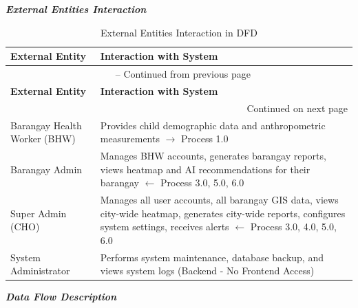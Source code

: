 \documentclass[12pt, a4paper]{report}
\begin{document}
\noindent \textbf{\textit{External Entities Interaction}}

\vspace{0.3cm}
\begin{longtable}{p{3.5cm} p{10.5cm}}
    \caption{External Entities Interaction in DFD} \label{tab:dfd_interaction} \\
    \toprule
    \textbf{External Entity} & \textbf{Interaction with System} \\
    \midrule
    \endfirsthead
    \multicolumn{2}{c}{{\tablename\ \thetable{} -- Continued from previous page}} \\
    \toprule
    \textbf{External Entity} & \textbf{Interaction with System} \\
    \midrule
    \endhead
    \midrule
    \multicolumn{2}{r}{{Continued on next page}} \\
    \endfoot
    \bottomrule
    \endlastfoot
    Barangay Health Worker (BHW) & Provides child demographic data and anthropometric measurements \(\rightarrow\) Process 1.0 \\
    \addlinespace
    Barangay Admin & Manages BHW accounts, generates barangay reports, views heatmap and AI recommendations for their barangay \(\leftarrow\) Process 3.0, 5.0, 6.0 \\
    \addlinespace
    Super Admin (CHO) & Manages all user accounts, all barangay GIS data, views city-wide heatmap, generates city-wide reports, configures system settings, receives alerts \(\leftarrow\) Process 3.0, 4.0, 5.0, 6.0 \\
    \addlinespace
    System Administrator & Performs system maintenance, database backup, and views system logs (Backend - No Frontend Access) \\
\end{longtable}
\vspace{0.3cm}

\noindent \textbf{\textit{Data Flow Description}}
\end{document}
